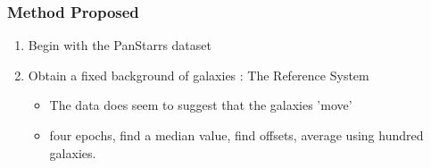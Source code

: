 \documentclass[10pt, compress]{beamer}
\begin{document}
\begin{frame}
\frametitle{Method Proposed}
	\begin{enumerate}
		\item Begin with the PanStarrs dataset
        \item Obtain a fixed background of galaxies : The Reference System
        	\begin{itemize}
				\item The data does seem to suggest that the galaxies 'move'
                \item four epochs, find a median value, find offsets, average using hundred galaxies.
               \end{itemize}
        
	\end{enumerate}
\end{frame}







\end{document}
